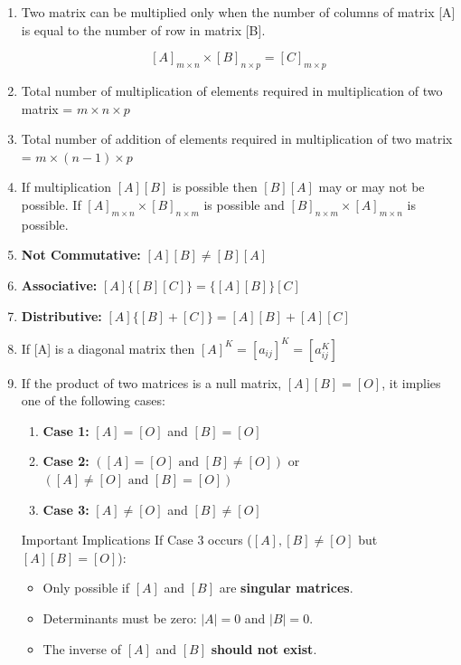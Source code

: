\begin{enumerate}
    \item Two matrix can be multiplied only when the number of columns of matrix [A] is equal to the number of row in matrix [B].

    $$[A]_{m \times n} \times [B]_{n \times p} = [C]_{m \times p}$$

    \item Total number of multiplication of elements required in multiplication of two matrix = $m \times n \times p$

    \item Total number of addition of elements required in multiplication of two matrix = $m \times (n- 1) \times p$

    \item If multiplication $[A][B]$ is possible then $[B][A]$ may or may not be possible. If $[A]_{m \times n} \times [B]_{n \times m}$ is possible and $[B]_{n \times m} \times [A]_{m \times n}$ is possible.

    \item \textbf{Not Commutative:} $[A][B] \neq [B][A]$

    \item \textbf{Associative:} $[A] \{[B][C]\} = \{[A][B]\} [C]$

    \item \textbf{Distributive:} $[A] \{[B] + [C]\} = [A][B] + [A][C]$

    \item If [A] is a diagonal matrix then $[A]^K = [a_{ij}]^K = [a^K_{ij}]$

    \item If the product of two matrices is a null matrix, $[A][B] = [O]$, it implies one of the following cases:

    \begin{enumerate}
        \item \textbf{Case 1:} $[A] = [O]$ and $[B] = [O]$
        \item \textbf{Case 2:} $([A] = [O] \text{ and } [B] \neq [O])$ or $([A] \neq [O] \text{ and } [B] = [O])$
        \item \textbf{Case 3:} $[A] \neq [O]$ and $[B] \neq [O]$
    \end{enumerate}

    \begin{impbox}{Important Implications}
        If Case 3 occurs ($[A], [B] \neq [O]$ but $[A][B] = [O]$):
        \begin{itemize}
            \item Only possible if $[A]$ and $[B]$ are \textbf{singular matrices}.
            \item Determinants must be zero: $|A| = 0$ and $|B| = 0$.
            \item The inverse of $[A]$ and $[B]$ \textbf{should not exist}.
        \end{itemize}
    \end{impbox}


\end{enumerate}
